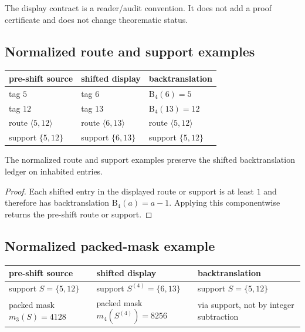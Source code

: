 \begin{remark}
\label{rem:v404-display-contract-not-theorem}
The display contract is a reader/audit convention. It does not add a proof
certificate and does not change theorematic status.
\end{remark}

\subsection{Normalized route and support examples}
\label{subsec:v404-normalized-route-support-examples}

\begin{center}
\small
\setlength{\tabcolsep}{4pt}
\begin{tabular}{@{}lll@{}}
\toprule
pre-shift source & shifted display & backtranslation\\
\midrule
tag $5$ & tag $6$ & $\mathrm B_4(6)=5$\\
tag $12$ & tag $13$ & $\mathrm B_4(13)=12$\\
route $\langle5,12\rangle$ & route $\langle6,13\rangle$ & route $\langle5,12\rangle$\\
support $\{5,12\}$ & support $\{6,13\}$ & support $\{5,12\}$\\
\bottomrule
\end{tabular}
\end{center}

\begin{lemma}
\label{lem:v404-route-support-display-normalization}
The normalized route and support examples preserve the shifted backtranslation
ledger on inhabited entries.
\end{lemma}

\begin{proof}
Each shifted entry in the displayed route or support is at least $1$ and therefore
has backtranslation $\mathrm B_4(a)=a-1$. Applying this componentwise returns
the pre-shift route or support.
\end{proof}

\subsection{Normalized packed-mask example}
\label{subsec:v404-normalized-packed-mask-example}

\begin{center}
\small
\setlength{\tabcolsep}{4pt}
\begin{tabular}{@{}lll@{}}
\toprule
pre-shift source & shifted display & backtranslation\\
\midrule
support $S=\{5,12\}$ & support $S^{(4)}=\{6,13\}$ & support $S=\{5,12\}$\\
packed mask $m_3(S)=4128$ & packed mask $m_4(S^{(4)})=8256$ & via support, not by integer subtraction\\
\bottomrule
\end{tabular}
\end{center}

